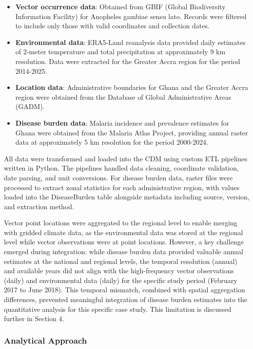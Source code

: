 \documentclass{article}
\begin{document}
\begin{itemize}
    \item \textbf{Vector occurrence data}: Obtained from GBIF (Global Biodiversity Information Facility) for Anopheles gambiae 
    sensu lato. Records were filtered to include only those with valid coordinates and collection dates.
    \item \textbf{Environmental data}: ERA5-Land reanalysis data provided daily estimates of 2-meter temperature and total 
    precipitation at approximately 9 km resolution. Data were extracted for the Greater Accra region for the period 2014-2025.
    \item \textbf{Location data}: Administrative boundaries for Ghana and the Greater Accra region were obtained from the 
    Database of Global Administrative Areas (GADM).
    \item \textbf{Disease burden data}: Malaria incidence and prevalence estimates for Ghana were obtained from the Malaria 
    Atlas Project, providing annual raster data at approximately 5 km resolution for the period 2000-2024.
\end{itemize}
\par
All data were transformed and loaded into the CDM using custom ETL pipelines written in Python. The pipelines handled data cleaning, 
coordinate validation, date parsing, and unit conversions. For disease burden data, raster files were processed to extract zonal 
statistics for each administrative region, with values loaded into the DiseaseBurden table alongside metadata including source, 
version, and extraction method.
\par
Vector point locations were aggregated to the regional level to enable merging with gridded climate data, as the environmental 
data was stored at the regional level while vector observations were at point locations. However, a key challenge emerged during 
integration: while disease burden data provided valuable annual estimates at the national and regional levels, the temporal 
resolution (annual) and available years did not align with the high-frequency vector observations (daily) and environmental 
data (daily) for the specific study period (February 2017 to June 2018). This temporal mismatch, combined with spatial 
aggregation differences, prevented meaningful integration of disease burden estimates into the quantitative analysis for 
this specific case study. This limitation is discussed further in Section 4.

\subsubsection{Analytical Approach}
\end{document}
